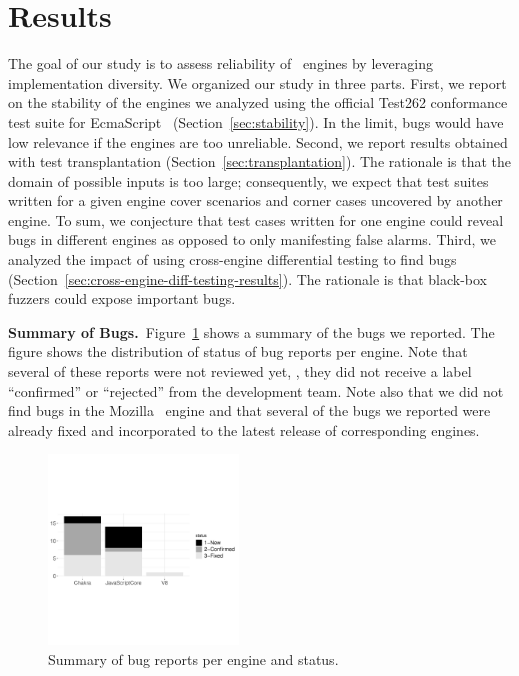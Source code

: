 \documentclass[10pt,conference,anonymous]{IEEEtran}
\begin{document}
\section{Results}
\label{sec:results}

The goal of our study is to assess reliability of \js\ engines by
leveraging implementation diversity. We organized our study in three
parts. First, we report on the stability of the engines we analyzed
using the official Test262 conformance test suite for
EcmaScript~\cite{ecma262-conformance-suite}
(Section~\ref{sec:stability}). In the limit, bugs would have low
relevance if the engines are too unreliable. Second, we report results
obtained with test transplantation
(Section~\ref{sec:transplantation}). The rationale is that the domain
of possible inputs is too large; consequently, we expect that test
suites written for a given engine cover scenarios and corner cases
uncovered by another engine. To sum, we conjecture that test cases
written for one engine could reveal bugs in different engines as
opposed to only manifesting false alarms. Third, we analyzed the
impact of using cross-engine differential testing to find bugs
(Section~\ref{sec:cross-engine-diff-testing-results}). The rationale
is that black-box fuzzers could expose important bugs.

\vspace{1ex}
\noindent\textbf{Summary of Bugs.}~Figure~\ref{fig:summary} shows a
summary of the bugs we reported. The figure shows the distribution of
status of bug reports per engine. Note that several of these reports
were not reviewed yet, \ie, they did not receive a label ``confirmed''
or ``rejected'' from the development team. Note also that we did not
find bugs in the Mozilla \smonkey\ engine and that several of the bugs
we reported were already fixed and incorporated to the latest release
of corresponding engines.

\begin{figure}[h]
  \centering
  \includegraphics[trim=0 120 0 150,clip,width=0.45\textwidth,scale=0.4]{R/stackedbar/stacked}  
  \caption{\label{fig:summary}Summary of bug reports per engine and status.}
\end{figure}
\end{document}
